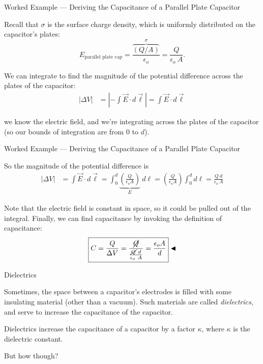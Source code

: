 \documentclass{beamer}
\begin{document}
\begin{frame}{Worked Example --- Deriving the Capacitance of a Parallel Plate Capacitor}

Recall that $\sigma$ is the surface charge density, which is uniformly distributed on the capacitor's plates:
\begin{equation*}
    E_{\text{parallel plate cap}} = \frac{\overbrace{\left( Q / A \right)}^{\sigma}}{\epsilon_o} = \frac{Q}{\epsilon_o\ A}.
\end{equation*}

We can integrate to find the magnitude of the potential difference across the plates of the capacitor:
\begin{align*}
    \big| \Delta V \big| &= \left| -\int \vec{E} \cdot d\vec{\ell} \right| = \int \vec{E} \cdot d\vec{\ell}
\end{align*}

we know the electric field, and we're integrating across the plates of the capacitor (so our bounds of integration are from $0$ to $d$).
    
\end{frame}

\begin{frame}{Worked Example --- Deriving the Capacitance of a Parallel Plate Capacitor}

So the magnitude of the potential difference is
\begin{align*}
    \big| \Delta V \big| &= \int \vec{E} \cdot d\vec{\ell} = \int_0^d \underbrace{\left( \frac{Q}{\epsilon_o A} \right)}_{E}\ d{\ell} = \left( \frac{Q}{\epsilon_o A} \right) {\int_0^d d\ell} = \frac{Q\ d}{\epsilon_o\ A}
\end{align*}

Note that the electric field is constant in space, so it could be pulled out of the integral. Finally, we can find capacitance by invoking the definition of capacitance:
\begin{equation*}
    \boxed{C = \frac{Q}{\Delta V} = \frac{\cancel{Q}}{\frac{\cancel{Q}\ d}{\epsilon_o\ A}} = \frac{\epsilon_o A}{d}} \blacktriangleleft
\end{equation*}

\end{frame}

\begin{frame}{Dielectrics}

Sometimes, the space between a capacitor's electrodes is filled with some insulating material (other than a vacuum). Such materials are called \emph{dielectrics}, and serve to increase the capacitance of the capacitor.

\vfill

Dielectrics increase the capacitance of a capacitor by a factor $\kappa$, where $\kappa$ is the dielectric constant.

\vfill

\begin{center}
But how though?
\end{center}

\end{frame}
\end{document}
